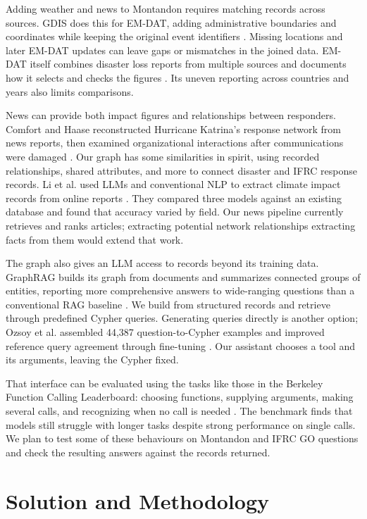 \documentclass[11pt]{article}
\begin{document}
Adding weather and news to Montandon requires matching records across sources.
GDIS does this for EM-DAT, adding administrative boundaries and coordinates while
keeping the original event identifiers \cite{rosvold2021gdis}. Missing locations
and later EM-DAT updates can leave gaps or mismatches in the joined data.
EM-DAT itself combines disaster loss reports from multiple sources and documents
how it selects and checks the figures \cite{delforge2025emdat}. Its uneven
reporting across countries and years also limits comparisons.

News can provide both impact figures and relationships between responders.
Comfort and Haase reconstructed Hurricane Katrina's response network from news
reports, then examined organizational interactions after communications were
damaged \cite{comfort2006communication}. Our graph has some similarities
in spirit, using recorded relationships, shared attributes, and more
to connect disaster and IFRC response records.
Li et al. used LLMs and conventional NLP to extract climate impact
records from online reports \cite{li2024climateimpacts}. They compared three
models against an existing database and found that accuracy varied by field.
Our news pipeline currently retrieves and ranks articles; extracting potential
network relationships extracting facts from them would extend that work.

The graph also gives an LLM access to records beyond its training data.
GraphRAG builds its graph from documents and summarizes connected groups of
entities, reporting more comprehensive answers to wide-ranging questions than
a conventional RAG baseline \cite{edge2024graphrag}. We build from structured
records and retrieve through predefined Cypher queries. Generating queries directly
is another option; Ozsoy et al. assembled 44,387 question-to-Cypher examples and
improved reference query agreement through fine-tuning \cite{ozsoy2025text2cypher}.
Our assistant chooses a tool and its arguments, leaving the Cypher fixed.

That interface can be evaluated using the tasks like those in the Berkeley Function
Calling Leaderboard: choosing functions, supplying arguments, making several
calls, and recognizing when no call is needed \cite{patil2025bfcl}. The benchmark
finds that models still struggle with longer tasks despite strong performance on
single calls. We plan to test some of these behaviours on Montandon and IFRC GO questions
and check the resulting answers against the records returned.

\section{Solution and Methodology}
\end{document}
